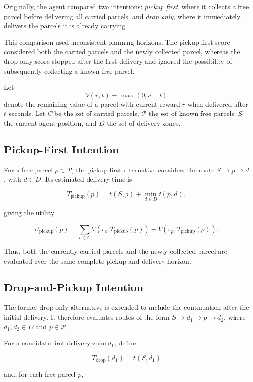 \documentclass[a4paper]{article}
\begin{document}
Originally, the agent compared two intentions: \emph{pickup first}, where it
collects a free parcel before delivering all carried parcels, and \emph{drop
only}, where it immediately delivers the parcels it is already carrying.

This comparison used inconsistent planning horizons. The pickup-first score
considered both the carried parcels and the newly collected parcel, whereas
the drop-only score stopped after the first delivery and ignored the possibility
of subsequently collecting a known free parcel.

Let
\[
    V(r,t) = \max(0,r-t)
\]
denote the remaining value of a parcel with current reward $r$ when delivered
after $t$ seconds. Let $C$ be the set of carried parcels, $\mathcal{P}$ the set
of known free parcels, $S$ the current agent position, and $D$ the set of
delivery zones.

\subsection{Pickup-First Intention}

For a free parcel $p \in \mathcal{P}$, the pickup-first alternative considers
the route $S \rightarrow p \rightarrow d$, with $d \in D$. Its estimated
delivery time is

\[
    T_{\mathrm{pickup}}(p)
    = t(S,p) + \min_{d \in D} t(p,d),
\]

giving the utility

\[
    U_{\mathrm{pickup}}(p)
    =
    \sum_{c \in C} V(r_c,T_{\mathrm{pickup}}(p))
    + V(r_p,T_{\mathrm{pickup}}(p)).
\]

Thus, both the currently carried parcels and the newly collected parcel are
evaluated over the same complete pickup-and-delivery horizon.

\subsection{Drop-and-Pickup Intention}

The former drop-only alternative is extended to include the continuation after
the initial delivery. It therefore evaluates routes of the form
$S \rightarrow d_1 \rightarrow p \rightarrow d_2$, where $d_1,d_2 \in D$
and $p \in \mathcal{P}$.

For a candidate first delivery zone $d_1$, define

\[
    T_{\mathrm{drop}}(d_1) = t(S,d_1)
\]

and, for each free parcel $p$,
\end{document}
